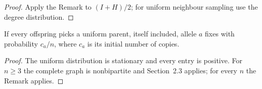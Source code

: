 \begin{proof}\leanok
Apply the Remark to $(I+H)/2$; for uniform neighbour sampling use the degree distribution.
\end{proof}
\begin{theorem}\label{thm:wright-fisher}
\leanok{}
If every offspring picks a uniform parent, itself included, allele $a$ fixes with probability
$c_a/n$, where $c_a$ is its initial number of copies.
\end{theorem}
\begin{proof}\leanok
The uniform distribution is stationary and every entry is positive. For $n\ge 3$ the
complete graph is nonbipartite and Section~2.3 applies; for every $n$ the Remark applies.
\end{proof}

